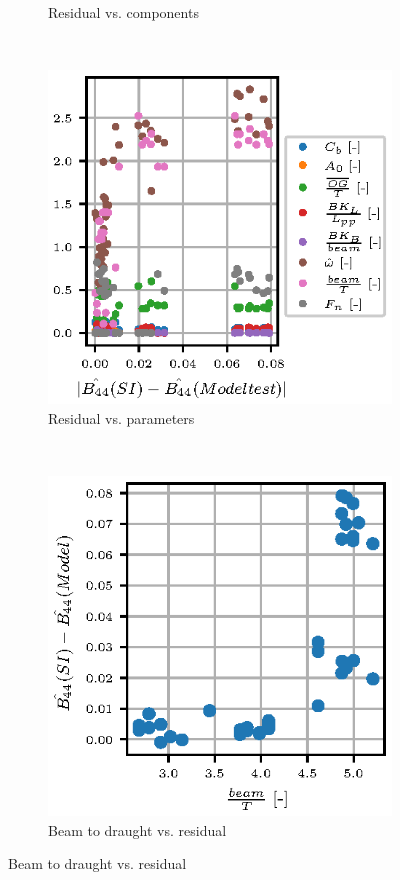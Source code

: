 \begin{figure}
\begin{subfigure}[b]{0.45\textwidth}
        \caption{Residual vs. components}
        \label{fig:component_residual}
    \end{subfigure}
    \newline
    ~ %
    \begin{subfigure}[b]{0.45\textwidth}
        \includegraphics[]{figures/parameter_residual.eps}
        \caption{Residual vs. parameters}
        \label{fig:parameter_residual}
    \end{subfigure}
    ~ %
    \begin{subfigure}[b]{0.45\textwidth}
        \includegraphics[]{figures/beam_T_residual.eps}
        \caption{Beam to draught vs. residual}
        \label{fig:beam_T_residual}
    \end{subfigure}
    

\end{figure}
